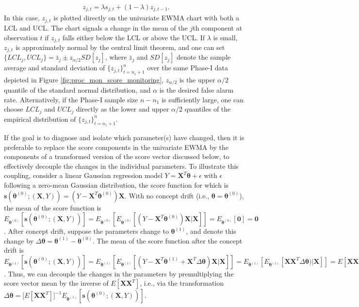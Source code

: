 \documentclass[twoside,11pt]{article}
\begin{document}
\begin{align}
z_{j,t} = \lambda s_{j,t} + (1 - \lambda) z_{j,t-1}.
\label{eqn:uniewma}
\end{align}
In this case, $z_{j,t}$ is plotted directly on the univariate EWMA chart with both a LCL and UCL. The chart signals a change in the mean of the $j$th component at observation $t$ if $z_{j,t}$ falls either below the LCL or above the UCL. If $\lambda$ is small, $z_{j,t}$ is approximately normal by the central limit theorem, and one can set  $\{LCL_j,UCL_j\} = \bar{z}_j \pm z_{\alpha/2}SD[z_j]$, where $\bar{z}_j$ and $SD[z_j]$ denote the sample average and standard deviation of $\{z_{j,t}\}_{t=n_1+1}^n$ over the same Phase-I data depicted in Figure \ref{fig:proc_mon_score_monitoring}, $z_{\alpha/2}$ is the upper $\alpha/2$ quantile of the standard normal distribution, and $\alpha$ is the desired false alarm rate. Alternatively, if the Phase-I sample size $n-n_1$ is sufficiently large, one can choose $LCL_j$ and $UCL_j$ directly as the lower and upper $\alpha/2$ quantiles of the empirical distribution of $\{z_{j,t}\}_{t=n_1+1}^n$. 

If the goal is to diagnose and isolate which parameter(s) have changed, then it is preferable to replace the score components in the univariate EWMA by the components of a transformed version of the score vector discussed below, to effectively decouple the changes in the individual parameters. To illustrate this coupling, consider a linear Gaussian regression model $Y = \bm{X}^T\bm{\theta} + \epsilon$ with $\epsilon$ following a zero-mean Gaussian distribution, the score function for which is $\bm{s}(\bm { \theta}^{ (0)}; (\bm {X}, Y)) = (Y - \bm{X}^T\bm{\theta}^{ (0)})\bm{X}$. With no concept drift (i.e., $\bm { \theta} = \bm { \theta}^{ (0)}$), the mean of the score function is $E_{\bm{ \theta}^{ (0)}}[\bm{s}(\bm { \theta}^{ (0)}; (\bm {X}, Y))] = E_{\bm{ \theta}^{ (0)}}[E_{\bm{ \theta}^{ (0)}}[(Y - \bm {X}^T\bm { \theta}^{ (0)} ) \bm {X}|\bm {X}]] =  E_{\bm{ \theta}^{ (0)}}[\bm{0}] = \bm{0}$. After concept drift, suppose the parameters change to $\bm { \theta} ^{ (1)}$, and denote this change by $ \Delta \bm { \theta} = \bm { \theta} ^{ (1)} - \bm { \theta}^ { (0)}$. The mean of the score function after the concept drift is $E_{\bm{ \theta}^{ (1)}}[\bm{s}(\bm { \theta}^{ (0)}; (\bm {X}, Y))] = E_{\bm{ \theta}^{ (1)}}[E_{\bm{ \theta}^{ (1)}}[(Y - \bm {X}^T\bm { \theta}^{ (1)} + \bm {X}^T\Delta \bm { \theta}) \bm {X} |\bm {X}]] = E_{\bm{ \theta}^{ (1)}}[E_{\bm{ \theta}^{ (1)}}[\bm {X}\bm {X}^T\Delta \bm { \theta}) |\bm {X}]] = E [\bm {X}\bm {X}^T] \Delta \bm { \theta}$. Thus, we can decouple the changes in the parameters by premultiplying the score vector mean by the inverse of $E [\bm {X}\bm {X}^T]$, i.e., via the transformation $ \Delta \bm { \theta} = \big[E [\bm {X}\bm {X}^T]\big]^{-1} E_{\bm{ \theta}^{ (1)}}[\bm{s}(\bm { \theta}^{ (0)}; (\bm {X}, Y))]$. 
\end{document}

